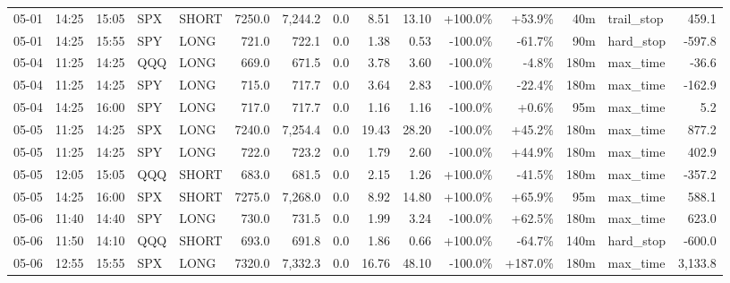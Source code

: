 \documentclass[11pt,a4paper,twoside]{article}
\begin{document}
\begin{landscape}
\begin{center}
\begin{longtable}{>{\color{txtmain}}l l l l l r r r r r r r r >{\color{txtmain}}l r}
05-01 & 14:25 & 15:05 & SPX & SHORT & 7250.0 & 7,244.2 & 0.0 & 8.51 & 13.10 & \textcolor{wingreen}{+100.0\%} & \textcolor{wingreen}{+53.9\%} & 40m & trail\_stop & \textcolor{wingreen}{459.1} \\
05-01 & 14:25 & 15:55 & SPY & LONG & 721.0 & 722.1 & 0.0 & 1.38 & 0.53 & \textcolor{lossred}{-100.0\%} & \textcolor{lossred}{-61.7\%} & 90m & hard\_stop & \textcolor{lossred}{-597.8} \\
05-04 & 11:25 & 14:25 & QQQ & LONG & 669.0 & 671.5 & 0.0 & 3.78 & 3.60 & \textcolor{lossred}{-100.0\%} & \textcolor{lossred}{-4.8\%} & 180m & max\_time & \textcolor{lossred}{-36.6} \\
05-04 & 11:25 & 14:25 & SPY & LONG & 715.0 & 717.7 & 0.0 & 3.64 & 2.83 & \textcolor{lossred}{-100.0\%} & \textcolor{lossred}{-22.4\%} & 180m & max\_time & \textcolor{lossred}{-162.9} \\
05-04 & 14:25 & 16:00 & SPY & LONG & 717.0 & 717.7 & 0.0 & 1.16 & 1.16 & \textcolor{lossred}{-100.0\%} & \textcolor{wingreen}{+0.6\%} & 95m & max\_time & \textcolor{wingreen}{5.2} \\
05-05 & 11:25 & 14:25 & SPX & LONG & 7240.0 & 7,254.4 & 0.0 & 19.43 & 28.20 & \textcolor{lossred}{-100.0\%} & \textcolor{wingreen}{+45.2\%} & 180m & max\_time & \textcolor{wingreen}{877.2} \\
05-05 & 11:25 & 14:25 & SPY & LONG & 722.0 & 723.2 & 0.0 & 1.79 & 2.60 & \textcolor{lossred}{-100.0\%} & \textcolor{wingreen}{+44.9\%} & 180m & max\_time & \textcolor{wingreen}{402.9} \\
05-05 & 12:05 & 15:05 & QQQ & SHORT & 683.0 & 681.5 & 0.0 & 2.15 & 1.26 & \textcolor{wingreen}{+100.0\%} & \textcolor{lossred}{-41.5\%} & 180m & max\_time & \textcolor{lossred}{-357.2} \\
05-05 & 14:25 & 16:00 & SPX & SHORT & 7275.0 & 7,268.0 & 0.0 & 8.92 & 14.80 & \textcolor{wingreen}{+100.0\%} & \textcolor{wingreen}{+65.9\%} & 95m & max\_time & \textcolor{wingreen}{588.1} \\
05-06 & 11:40 & 14:40 & SPY & LONG & 730.0 & 731.5 & 0.0 & 1.99 & 3.24 & \textcolor{lossred}{-100.0\%} & \textcolor{wingreen}{+62.5\%} & 180m & max\_time & \textcolor{wingreen}{623.0} \\
05-06 & 11:50 & 14:10 & QQQ & SHORT & 693.0 & 691.8 & 0.0 & 1.86 & 0.66 & \textcolor{wingreen}{+100.0\%} & \textcolor{lossred}{-64.7\%} & 140m & hard\_stop & \textcolor{lossred}{-600.0} \\
05-06 & 12:55 & 15:55 & SPX & LONG & 7320.0 & 7,332.3 & 0.0 & 16.76 & 48.10 & \textcolor{lossred}{-100.0\%} & \textcolor{wingreen}{+187.0\%} & 180m & max\_time & \textcolor{wingreen}{3,133.8} \\

\end{longtable}
\end{center}
\end{landscape}
\end{document}
